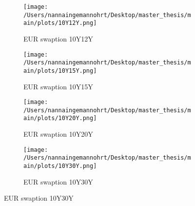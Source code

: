\begin{figure}[htbp]
    \begin{subfigure}{0.43\textwidth}
        \texttt{[image: /Users/nannaingemannohrt/Desktop/master\_thesis/main/plots/10Y12Y.png]}
        \caption{EUR swaption 10Y12Y}
        \label{fig:10Y12Y_}
    \end{subfigure}\hfill
    \begin{subfigure}{0.43\textwidth}
        \texttt{[image: /Users/nannaingemannohrt/Desktop/master\_thesis/main/plots/10Y15Y.png]}
        \caption{EUR swaption 10Y15Y}
        \label{fig:10Y15Y_}
    \end{subfigure}
    \begin{subfigure}{0.43\textwidth}
        \texttt{[image: /Users/nannaingemannohrt/Desktop/master\_thesis/main/plots/10Y20Y.png]}
        \caption{EUR swaption 10Y20Y}
        \label{fig:10Y20Y_}
    \end{subfigure}\hfill
    \begin{subfigure}{0.43\textwidth}
        \texttt{[image: /Users/nannaingemannohrt/Desktop/master\_thesis/main/plots/10Y30Y.png]}
        \caption{EUR swaption 10Y30Y}
        \label{fig:10Y30Y_}
    \end{subfigure}

\end{figure}   